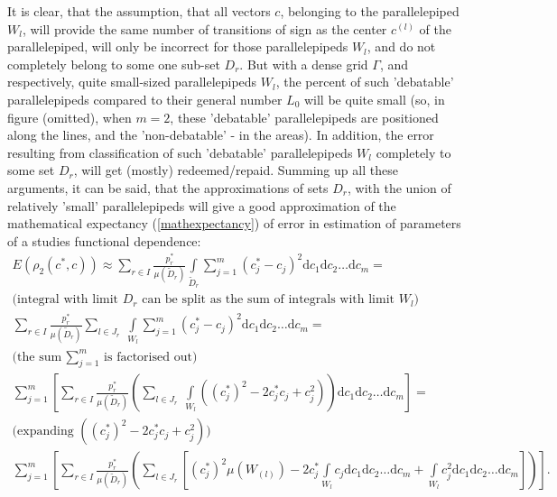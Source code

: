 It is clear, that the assumption, that all vectors $c$, belonging to the parallelepiped $W_{l}$, will provide the same number of transitions of sign as the center $c^{(l)}$ of the parallelepiped, will only be incorrect for those parallelepipeds $W_{l}$, and do not completely belong to some one sub-set $D_{r}$. But with a dense grid $\Gamma$, and respectively, quite small-sized parallelepipeds $W_{l}$, the percent of such 'debatable' parallelepipeds compared to their general number $L_{0}$ will be quite small (so, in figure (omitted), when $m=2$, these 'debatable' parallelepipeds are positioned along the lines, and the 'non-debatable' - in the areas). In addition, the error resulting from classification of such 'debatable' parallelepipeds $W_{l}$ completely to some set $D_{r}$, will get (mostly) redeemed/repaid. Summing up all these arguments, it can be said, that the approximations of sets $D_{r}$, with the union of relatively 'small' parallelepipeds will give a good  approximation of the mathematical expectancy (\ref{mathexpectancy}) of error in estimation of parameters of a studies functional dependence:
\begin{gather}
\nonumber
E(\rho_{2}(c^{*},c)) \approx \sum\limits_{r \in I} \frac{p_{r}^{*}}{\mu(\tilde{D}_{r})} \int\limits_{\tilde{D}_{r}} \sum\limits_{j=1}^{m}(c_{j}^{*}-c_{j})^{2}\mathrm{d}c_{1}\mathrm{d}c_{2}\dots \mathrm{d}c_{m} = \\
\nonumber 
\text{(integral with limit } D_{r} \text{ can be split as the sum of integrals with limit } W_{l} \text{)}\\
\sum\limits_{r \in I} \frac{p_{r}^{*}}{\mu(\tilde{D}_{r})} \sum\limits_{l \in J_{r}} \  \int\limits_{W_{l}} \sum\limits_{j=1}^{m}(c_{j}^{*}-c_{j})^{2}\mathrm{d}c_{1}\mathrm{d}c_{2}\dots \mathrm{d}c_{m} = \\
\nonumber
\text{(the sum } \sum_{j=1}^{m} \text{ is factorised out)} \\
\nonumber
\sum\limits_{j=1}^{m}  \left[ \sum\limits_{r \in I} \frac{p_{r}^{*}}{\mu(\tilde{D}_{r})} \left( \sum\limits_{l \in J_{r}} \ \int\limits_{W_{l}} ((c_{j}^{*})^{2}-2c_{j}^{*}c_{j}+c_{j}^{2}) \right) \mathrm{d}c_{1}\mathrm{d}c_{2}\dots \mathrm{d}c_{m} \right] = \\
\nonumber
\text{(expanding } ((c_{j}^{*})^{2}-2c_{j}^{*}c_{j}+c_{j}^{2}) \text{)}\\
\sum\limits_{j=1}^{m}  \left[ \sum\limits_{r \in I} \frac{p_{r}^{*}}{\mu(\tilde{D}_{r})} \left( \sum\limits_{l \in J_{r}} \left[ (c_{j}^{*})^{2} \mu(W_{(l)}) - 2c_{j}^{*} \int\limits_{W_{l}} c_{j} \mathrm{d}c_{1}\mathrm{d}c_{2}\dots \mathrm{d}c_{m} + \int\limits_{W_{l}} c_{j}^{2} \mathrm{d}c_{1}\mathrm{d}c_{2}\dots \mathrm{d}c_{m} \right] \right) \right]. \label{eq-simplification-chain}
\end{gather}
